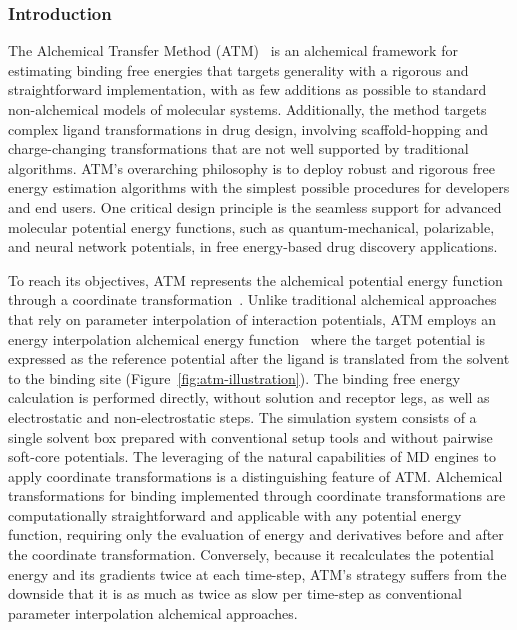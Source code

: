 \documentclass[9pt,bestpractices]{livecoms}
\begin{document}
\subsubsection{Introduction}
 
The Alchemical Transfer Method (ATM)~\cite{wu2021alchemical,azimi2022relative} is an alchemical framework for estimating binding free energies that targets generality with a rigorous and straightforward implementation, with as few additions as possible to standard non-alchemical models of molecular systems. Additionally, the method targets complex ligand transformations in drug design, involving scaffold-hopping and charge-changing transformations that are not well supported by traditional algorithms. ATM's overarching philosophy is to deploy robust and rigorous free energy estimation algorithms with the simplest possible procedures for developers and end users. One critical design principle is the seamless support for advanced molecular potential energy functions, such as quantum-mechanical, polarizable, and neural network potentials, in free energy-based drug discovery applications. 

To reach its objectives, ATM represents the alchemical potential energy function through a coordinate transformation~\cite{azimi2022application,azimi2022relative}. Unlike traditional alchemical approaches that rely on parameter interpolation of interaction potentials, ATM employs an energy interpolation alchemical energy function~\cite{konig2021efficient} where the target potential is expressed as the reference potential after the ligand is translated from the solvent to the binding site (Figure~\ref{fig:atm-illustration}). The binding free energy calculation is performed directly, without solution and receptor legs, as well as electrostatic and non-electrostatic steps. The simulation system consists of a single solvent box prepared with conventional setup tools and without pairwise soft-core potentials.  The leveraging of the natural capabilities of MD engines to apply coordinate transformations is a distinguishing feature of ATM. Alchemical transformations for binding implemented through coordinate transformations are computationally straightforward and applicable with any potential energy function, requiring only the evaluation of energy and derivatives before and after the coordinate transformation. Conversely, because it recalculates the potential energy and its gradients twice at each time-step, ATM's strategy suffers from the downside that it is as much as twice as slow per time-step as conventional parameter interpolation alchemical approaches.
\end{document}
